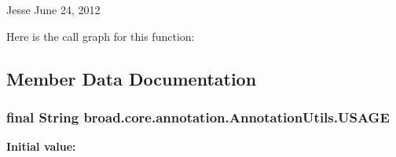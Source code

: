 Jesse June 24, 2012

Here is the call graph for this function\+:




\subsection{Member Data Documentation}
\hypertarget{classbroad_1_1core_1_1annotation_1_1_annotation_utils_a16dc3e22e45005f5af0a680d703caf95}{
\subsubsection[{U\+S\+A\+G\+E}]{\setlength{\rightskip}{0pt plus 5cm}final String broad.\+core.\+annotation.\+Annotation\+Utils.\+U\+S\+A\+G\+E\hspace{0.3cm}{\ttfamily [static]}}}\label{classbroad_1_1core_1_1annotation_1_1_annotation_utils_a16dc3e22e45005f5af0a680d703caf95}
{\bfseries Initial value\+:}
